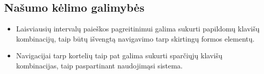 \subsection{Našumo kėlimo galimybės}
\begin{itemize}
  \item Laisviausių intervalų paieškos pagreitinimui galima sukurti papildomų klavišų kombinacijų, taip būtų išvengtą navigavimo tarp skirtingų formos elementų.
  \item Navigacijai tarp kortelių taip pat galima sukurti sparčiųjų klavišų kombinacijas, taip
  paspartinant naudojimąsi sistema.
\end{itemize}
